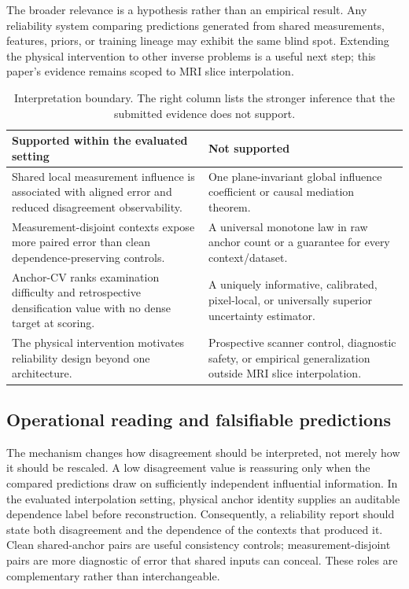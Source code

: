 \documentclass[10pt,twocolumn,letterpaper]{article}
\begin{document}
The broader relevance is a hypothesis rather than an empirical result. Any reliability system comparing predictions generated from shared measurements, features, priors, or training lineage may exhibit the same blind spot. Extending the physical intervention to other inverse problems is a useful next step; this paper's evidence remains scoped to MRI slice interpolation.

\begin{table}[t]
\centering
\caption{Interpretation boundary. The right column lists the stronger inference that the submitted evidence does not support.}
\label{tab:boundary}
\setlength{\tabcolsep}{6pt}
\begin{tabular}{p{}p{}}
\toprule
Supported within the evaluated setting & Not supported \\
\midrule
Shared local measurement influence is associated with aligned error and reduced disagreement observability. & One plane-invariant global influence coefficient or causal mediation theorem. \\
Measurement-disjoint contexts expose more paired error than clean dependence-preserving controls. & A universal monotone law in raw anchor count or a guarantee for every context/dataset. \\
Anchor-CV ranks examination difficulty and retrospective densification value with no dense target at scoring. & A uniquely informative, calibrated, pixel-local, or universally superior uncertainty estimator. \\
The physical intervention motivates reliability design beyond one architecture. & Prospective scanner control, diagnostic safety, or empirical generalization outside MRI slice interpolation. \\
\bottomrule
\end{tabular}
\end{table}

\FloatBarrier

\subsection{Operational reading and falsifiable predictions}
The mechanism changes how disagreement should be interpreted, not merely how it should be rescaled. A low disagreement value is reassuring only when the compared predictions draw on sufficiently independent influential information. In the evaluated interpolation setting, physical anchor identity supplies an auditable dependence label before reconstruction. Consequently, a reliability report should state both disagreement and the dependence of the contexts that produced it. Clean shared-anchor pairs are useful consistency controls; measurement-disjoint pairs are more diagnostic of error that shared inputs can conceal. These roles are complementary rather than interchangeable.
\end{document}
